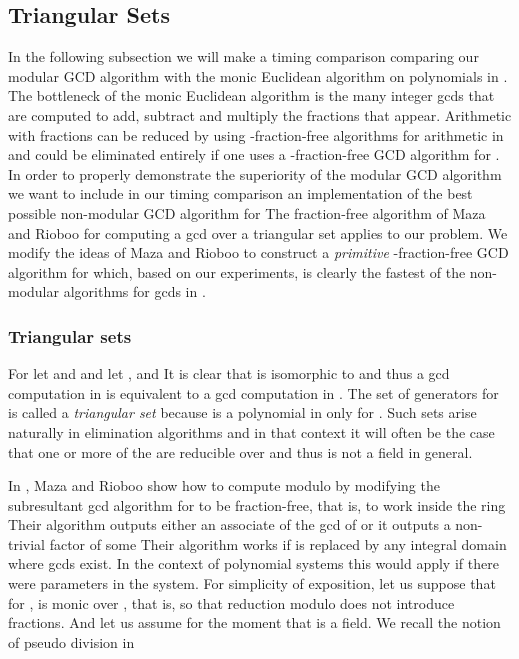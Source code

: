 \documentclass[10pt]{article}
\begin{document}
 


\subsection{Triangular Sets}

In the following subsection we will make a timing comparison
comparing our modular GCD algorithm with the monic Euclidean
algorithm on polynomials in . The bottleneck of the monic
Euclidean algorithm is the many integer gcds that are computed to
add, subtract and multiply the fractions that appear. Arithmetic
with fractions can be reduced by using -fraction-free
algorithms for arithmetic in  and could be eliminated entirely if
one uses a -fraction-free GCD algorithm for . In order to
properly demonstrate the superiority of the modular GCD algorithm we
want to include in our timing comparison an implementation of the
best possible non-modular GCD algorithm for  The
fraction-free algorithm of Maza and Rioboo \cite{Maza} for computing
a gcd over a triangular set applies to our problem. We modify the
ideas of Maza and Rioboo to construct a {\it primitive}
-fraction-free GCD algorithm for  which, based on our
experiments, is clearly the fastest of the non-modular algorithms
for gcds in .






\subsubsection*{Triangular sets}

For  let   and
  and
let ,  and 
It is clear that  is isomorphic to  and thus a
gcd computation in  is equivalent to a gcd computation in .
The set of generators  for  is called a {\it triangular set}
because  is a polynomial in  only for .
Such sets arise naturally in elimination algorithms and in that context it will
often be the case that one or more of the  are reducible over 
and thus  is not a field in general.



In \cite{Maza}, Maza and Rioboo show how to compute  modulo  by modifying the
subresultant gcd algorithm for  to be fraction-free, that is, to work
inside the ring  Their algorithm outputs either
an associate of the gcd of  or it outputs a non-trivial factor
of some   Their algorithm works if  is replaced by any integral
domain where gcds exist.  In the context of polynomial systems
this would apply if there were parameters in the system.
For simplicity of exposition, let us suppose that for ,
 is monic over , that is, 
so that reduction modulo  does not introduce fractions.
And let us assume for the moment that  is a field.
We recall the notion of pseudo division in 
\end{document}
